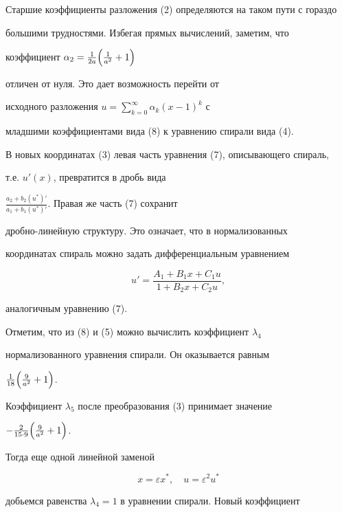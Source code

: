  


Старшие коэффициенты разложения (2) определяются на таком пути с гораздо 


большими трудностями. Избегая прямых вычислений, заметим, что 


коэффициент $\alpha_2=\frac{1}{2a}\Bigl(\frac{1}{a^2}+1\Bigr)$ 


отличен от нуля. Это дает возможность перейти от 


исходного разложения $u=\sum\limits^\infty_{k=0}\alpha_k(x-1)^k$ с 


младшими коэффициентами вида (8) к уравнению спирали вида (4). 


 


В новых координатах (3) левая часть уравнения (7), описывающего спираль, 


т.е. $u'(x)$, превратится в дробь вида 


$\frac{a_2+b_2(u^*)'}{a_1+b_1(u^*)'}$. Правая же часть (7) сохранит 


дробно-линейную структуру. Это означает, что в нормализованных 


координатах спираль можно задать дифференциальным уравнением 


\begin{equation} 


u'=\frac{A_1+B_1x+C_1u}{1+B_2x+C_2u}, 


\end{equation} 


аналогичным уравнению (7). 


 


Отметим, что из (8) и (5) можно вычислить коэффициент $\lambda_4$ 


нормализованного уравнения спирали. Он оказывается равным 


$\frac{1}{18}\Bigl(\frac{9}{a^2}+1\Bigr)$. 


Коэффициент $\lambda_5$ после преобразования (3) принимает значение 


$-\frac{2}{15\cdot 9}\Bigl(\frac{9}{a^2}+1\Bigr)$. 


 


Тогда еще одной линейной заменой 


$$ 


x=\varepsilon x^*,\quad u=\varepsilon^2 u^* 


$$ 


добьемся равенства $\lambda_4=1$ в уравнении спирали. Новый коэффициент 


